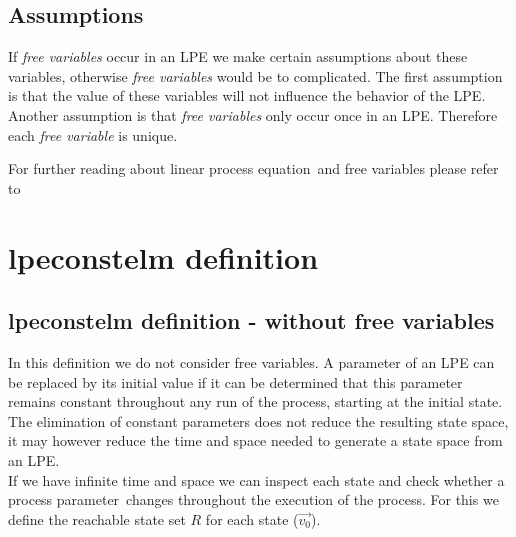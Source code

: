 \index{}\documentclass[a4paper,10pt]{article}
\theoremstyle{plain}
\theoremstyle{definition}
\newcommand{\lpe}{linear process equation}
\newcommand{\ovr}{\overrightarrow}
\newcommand{\pp}{process parameter}
\newcommand{\ti}{\textit}
\begin{document}
\subsection{Assumptions}
If \ti{free variables} occur in an LPE we make certain assumptions about these variables, otherwise \ti{free variables} would be to complicated. The first assumption is that the value of these variables will not influence the behavior of the LPE. Another assumption is that \ti{free variables} only occur once in an LPE. Therefore each \ti{free variable} is unique. %


 
For further reading about \lpe\ and free variables please refer to \cite{LPEfreevar} 

\section{lpeconstelm definition}
\subsection{lpeconstelm definition - without free variables}\label{subsec:lpedef}

In this definition we do not consider free variables.
A parameter of an LPE can be replaced by its initial value if it can be determined that this parameter remains constant throughout any run of the process, starting at the initial state. The elimination of constant parameters does not reduce the resulting state space, it may however reduce the time and space needed to generate a state space from an LPE. \\
If we have infinite time and space we can inspect each state and check whether a \pp\ changes throughout the execution of the process. For this we define the reachable state set $R$ for each state ($\ovr{v_0}$). 
\end{document}
